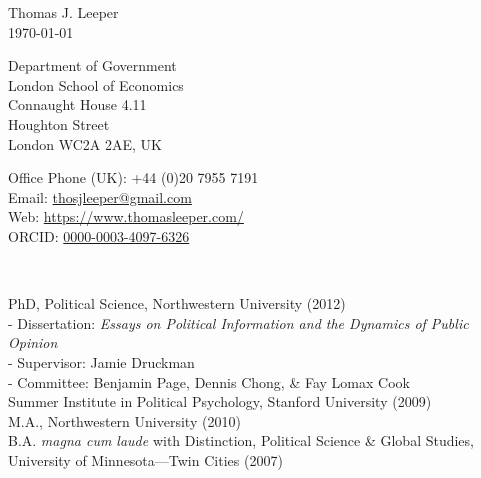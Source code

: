 \documentclass[12pt]{article}
\renewcommand{\section}[1]{\pagebreak[3]%
    \llap{\scshape\smash{\parbox[t]{\marginparwidth}{\raggedright {\color{lg}#1}}}}%
    \vspace{-\baselineskip}\par}
\newcommand{\entry}[1]{\indent {\color{lg}\guillemotright}\hspace{2pt}#1\vspace{.25em}\\}
\newcommand{\subentry}[1]{{\color{lg}-} #1\vspace{.25em}\\}
\begin{document}
{\LARGE Thomas J. Leeper}\\

\today\\

\begin{minipage}[b]{0.5\linewidth}
Department of Government\\
London School of Economics\\
Connaught House 4.11\\
Houghton Street\\
London WC2A 2AE, UK
\end{minipage}
\begin{minipage}[b]{0.5\linewidth}
Office Phone (UK): +44 (0)20 7955 7191\\
Email: \href{mailto:thosjleeper@gmail.com}{thosjleeper@gmail.com}\\
Web: \href{https://www.thomasleeper.com/}{https://www.thomasleeper.com/}\\
ORCID: \href{http://orcid.org/0000-0003-4097-6326}{0000-0003-4097-6326}
\end{minipage}\\

\section{Education}
\entry{PhD, Political Science, Northwestern University (2012)}
	\subentry{Dissertation: \textit{Essays on Political Information and the Dynamics of Public Opinion}}
	\subentry{Supervisor: Jamie Druckman}
	\subentry{Committee: Benjamin Page, Dennis Chong, \& Fay Lomax Cook}
\entry{Summer Institute in Political Psychology, Stanford University (2009)}
\entry{M.A., Northwestern University (2010)}
\entry{B.A. \textit{magna cum laude} with Distinction, Political Science \& Global Studies, University of Minnesota---Twin Cities (2007)}
\end{document}
